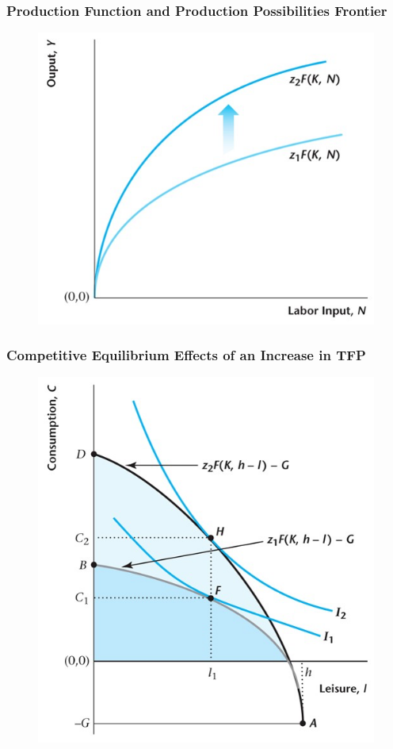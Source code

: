\documentclass{beamer}
\begin{document}
\begin{frame}
\frametitle[alignment=center]{Production Function and Production Possibilities Frontier}
\begin{figure}
\centering
\includegraphics[scale=0.5]{Figures/W_Fig_5pt8.png}
\end{figure}
\end{frame}

\begin{frame}
\frametitle[alignment=center]{Competitive Equilibrium Effects of an Increase in TFP}
\begin{figure}
\centering
\includegraphics[scale=0.5]{Figures/W_Fig_5pt9.png}
\end{figure}
\end{frame}
\end{document}
